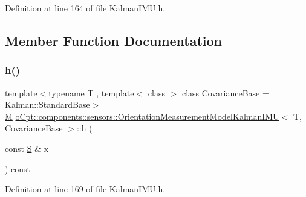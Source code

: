Definition at line 164 of file Kalman\+I\+M\+U.\+h.



\subsection{Member Function Documentation}
\hypertarget{classo_cpt_1_1components_1_1sensors_1_1_orientation_measurement_model_kalman_i_m_u_a8d3bb87295520e0d4b5f02975fa420f0}{}\label{classo_cpt_1_1components_1_1sensors_1_1_orientation_measurement_model_kalman_i_m_u_a8d3bb87295520e0d4b5f02975fa420f0} 
\subsubsection{\texorpdfstring{h()}{h()}}
{\footnotesize\ttfamily template$<$typename T , template$<$ class $>$ class Covariance\+Base = Kalman\+::\+Standard\+Base$>$ \\
\hyperlink{classo_cpt_1_1components_1_1sensors_1_1_orientation_measurement_model_kalman_i_m_u_aa47a5c6cf0a9125a5ed587a7fefef876}{M} \hyperlink{classo_cpt_1_1components_1_1sensors_1_1_orientation_measurement_model_kalman_i_m_u}{o\+Cpt\+::components\+::sensors\+::\+Orientation\+Measurement\+Model\+Kalman\+I\+MU}$<$ T, Covariance\+Base $>$\+::h (\begin{DoxyParamCaption}\item[{const \hyperlink{classo_cpt_1_1components_1_1sensors_1_1_orientation_measurement_model_kalman_i_m_u_a3104263971226357108cef704d272f90}{S} \&}]{x }\end{DoxyParamCaption}) const\hspace{0.3cm}{\ttfamily [inline]}}



Definition at line 169 of file Kalman\+I\+M\+U.\+h.



